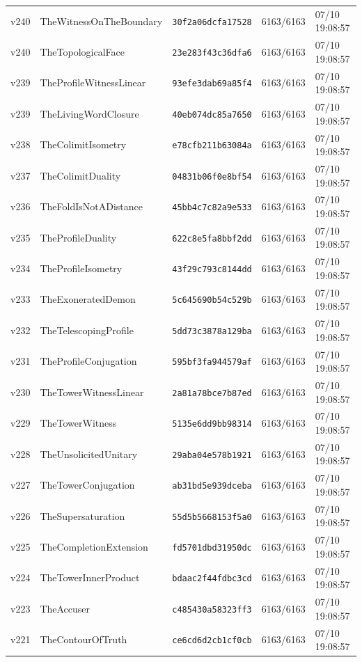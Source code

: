 \documentclass[11pt]{article}
\theoremstyle{definition}\newtheorem{deriv}{Derivação}
\begin{document}
{\begin{longtable}{@{}lllll@{}}
v240 & TheWitnessOnTheBoundary & \texttt{30f2a06dcfa17528} & 6163/6163 & 07/10 19:08:57 \\
v240 & TheTopologicalFace & \texttt{23e283f43c36dfa6} & 6163/6163 & 07/10 19:08:57 \\
v239 & TheProfileWitnessLinear & \texttt{93efe3dab69a85f4} & 6163/6163 & 07/10 19:08:57 \\
v239 & TheLivingWordClosure & \texttt{40eb074dc85a7650} & 6163/6163 & 07/10 19:08:57 \\
v238 & TheColimitIsometry & \texttt{e78cfb211b63084a} & 6163/6163 & 07/10 19:08:57 \\
v237 & TheColimitDuality & \texttt{04831b06f0e8bf54} & 6163/6163 & 07/10 19:08:57 \\
v236 & TheFoldIsNotADistance & \texttt{45bb4c7c82a9e533} & 6163/6163 & 07/10 19:08:57 \\
v235 & TheProfileDuality & \texttt{622c8e5fa8bbf2dd} & 6163/6163 & 07/10 19:08:57 \\
v234 & TheProfileIsometry & \texttt{43f29c793c8144dd} & 6163/6163 & 07/10 19:08:57 \\
v233 & TheExoneratedDemon & \texttt{5c645690b54c529b} & 6163/6163 & 07/10 19:08:57 \\
v232 & TheTelescopingProfile & \texttt{5dd73c3878a129ba} & 6163/6163 & 07/10 19:08:57 \\
v231 & TheProfileConjugation & \texttt{595bf3fa944579af} & 6163/6163 & 07/10 19:08:57 \\
v230 & TheTowerWitnessLinear & \texttt{2a81a78bce7b87ed} & 6163/6163 & 07/10 19:08:57 \\
v229 & TheTowerWitness & \texttt{5135e6dd9bb98314} & 6163/6163 & 07/10 19:08:57 \\
v228 & TheUnsolicitedUnitary & \texttt{29aba04e578b1921} & 6163/6163 & 07/10 19:08:57 \\
v227 & TheTowerConjugation & \texttt{ab31bd5e939dceba} & 6163/6163 & 07/10 19:08:57 \\
v226 & TheSupersaturation & \texttt{55d5b5668153f5a0} & 6163/6163 & 07/10 19:08:57 \\
v225 & TheCompletionExtension & \texttt{fd5701dbd31950dc} & 6163/6163 & 07/10 19:08:57 \\
v224 & TheTowerInnerProduct & \texttt{bdaac2f44fdbc3cd} & 6163/6163 & 07/10 19:08:57 \\
v223 & TheAccuser & \texttt{c485430a58323ff3} & 6163/6163 & 07/10 19:08:57 \\
v221 & TheContourOfTruth & \texttt{ce6cd6d2cb1cf0cb} & 6163/6163 & 07/10 19:08:57 \\

\end{longtable}}
\end{document}

